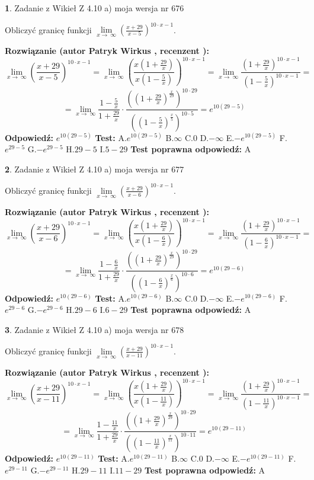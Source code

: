 \documentclass[12pt, a4paper]{article}
\theoremstyle{definition} %
\newtheorem{zad}{}
\newcommand{\zadStart}[1]{\begin{zad}#1\newline}
\newcommand{\zadStop}{\end{zad}}
\newcommand{\rozwStart}[2]{\noindent \textbf{Rozwiązanie (autor #1 , recenzent #2): }\newline}
\newcommand{\rozwStop}{\newline}
\newcommand{\odpStart}{\noindent \textbf{Odpowiedź:}\newline}
\newcommand{\odpStop}{\newline}
\newcommand{\testStart}{\noindent \textbf{Test:}\newline}
\newcommand{\testStop}{\newline}
\newcommand{\kluczStart}{\noindent \textbf{Test poprawna odpowiedź:}\newline}
\newcommand{\kluczStop}{\newline}
\begin{document}
\zadStart{Zadanie z Wikieł Z 4.10 a) moja wersja nr 676}


Obliczyć granicę funkcji  $\lim\limits_{x\to\ \infty}(\frac{x+29}{x-5})^{10\cdot x-1}$.
\zadStop
\rozwStart{Patryk Wirkus}{}
$$\lim\limits_{x\to\ \infty}(\frac{x+29}{x-5})^{10\cdot x-1} = \lim\limits_{x\to\ \infty}(\frac{x(1+\frac{29}{x})}{x(1-\frac{5}{x})})^{10\cdot x-1}=\lim\limits_{x\to\ \infty}\frac{(1+\frac{29}{x})^{10\cdot x-1}}{(1-\frac{5}{x})^{10\cdot x-1}}=$$
$$=\lim\limits_{x\to\ \infty}\frac{1-\frac{5}{x}}{1+\frac{29}{x}}\cdot\frac{((1+\frac{29}{x})^{\frac{x}{29}})^{10\cdot29}}{((1-\frac{5}{x})^{\frac{x}{5}})^{10\cdot5}}=e^{10(29-5)}$$
\rozwStop
\odpStart
$e^{10(29-5)}$
\odpStop
\testStart
A.$e^{10(29-5)}$ B.$\infty$ C.$0$ D.$-\infty$ E.$-e^{10(29-5)}$
F.$e^{29-5}$ G.$-e^{29-5}$
H.$29-5$
I.$5-29$
\testStop
\kluczStart
A
\kluczStop



\zadStart{Zadanie z Wikieł Z 4.10 a) moja wersja nr 677}


Obliczyć granicę funkcji  $\lim\limits_{x\to\ \infty}(\frac{x+29}{x-6})^{10\cdot x-1}$.
\zadStop
\rozwStart{Patryk Wirkus}{}
$$\lim\limits_{x\to\ \infty}(\frac{x+29}{x-6})^{10\cdot x-1} = \lim\limits_{x\to\ \infty}(\frac{x(1+\frac{29}{x})}{x(1-\frac{6}{x})})^{10\cdot x-1}=\lim\limits_{x\to\ \infty}\frac{(1+\frac{29}{x})^{10\cdot x-1}}{(1-\frac{6}{x})^{10\cdot x-1}}=$$
$$=\lim\limits_{x\to\ \infty}\frac{1-\frac{6}{x}}{1+\frac{29}{x}}\cdot\frac{((1+\frac{29}{x})^{\frac{x}{29}})^{10\cdot29}}{((1-\frac{6}{x})^{\frac{x}{6}})^{10\cdot6}}=e^{10(29-6)}$$
\rozwStop
\odpStart
$e^{10(29-6)}$
\odpStop
\testStart
A.$e^{10(29-6)}$ B.$\infty$ C.$0$ D.$-\infty$ E.$-e^{10(29-6)}$
F.$e^{29-6}$ G.$-e^{29-6}$
H.$29-6$
I.$6-29$
\testStop
\kluczStart
A
\kluczStop



\zadStart{Zadanie z Wikieł Z 4.10 a) moja wersja nr 678}


Obliczyć granicę funkcji  $\lim\limits_{x\to\ \infty}(\frac{x+29}{x-11})^{10\cdot x-1}$.
\zadStop
\rozwStart{Patryk Wirkus}{}
$$\lim\limits_{x\to\ \infty}(\frac{x+29}{x-11})^{10\cdot x-1} = \lim\limits_{x\to\ \infty}(\frac{x(1+\frac{29}{x})}{x(1-\frac{11}{x})})^{10\cdot x-1}=\lim\limits_{x\to\ \infty}\frac{(1+\frac{29}{x})^{10\cdot x-1}}{(1-\frac{11}{x})^{10\cdot x-1}}=$$
$$=\lim\limits_{x\to\ \infty}\frac{1-\frac{11}{x}}{1+\frac{29}{x}}\cdot\frac{((1+\frac{29}{x})^{\frac{x}{29}})^{10\cdot29}}{((1-\frac{11}{x})^{\frac{x}{11}})^{10\cdot11}}=e^{10(29-11)}$$
\rozwStop
\odpStart
$e^{10(29-11)}$
\odpStop
\testStart
A.$e^{10(29-11)}$ B.$\infty$ C.$0$ D.$-\infty$ E.$-e^{10(29-11)}$
F.$e^{29-11}$ G.$-e^{29-11}$
H.$29-11$
I.$11-29$
\testStop
\kluczStart
A
\kluczStop
\end{document}
